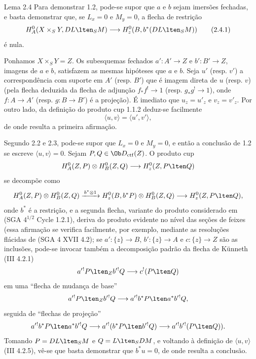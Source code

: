 \begin{statement}{Lema 2.4}
Para demonstrar 1.2, pode-se supor que $a$ e $b$ sejam imersões fechadas, e basta demonstrar que, se $L_x=0$ e $M_y=0$, a flecha de restrição
\begin{equation}
H_A^0(X\times_SY,DL\lten_SM)
 \longrightarrow H_z^0(B,b^*(DL\lten_SM))
\tag{2.4.1}
\end{equation}
é nula.
\end{statement}

Ponhamos $X\times_SY=Z$. Os subesquemas fechados $a':A'\to Z$ e $b':B'\to Z$, imagens de $a$ e $b$, satisfazem as mesmas hipóteses que $a$ e $b$. Seja $u'$ (resp. $v'$) a correspondência com suporte em $A'$ (resp. $B'$) que é imagem direta de $u$ (resp. $v$) (pela flecha deduzida da flecha de adjunção $f_*f^!\to 1$ (resp. $g_*g^!\to 1$), onde $f:A\to A'$ (resp. $g:B\to B'$) é a projeção). É imediato que $u_z=u'_z$ e $v_z=v'_z$. Por outro lado, da definição do produto cup 1.1.2 deduz-se facilmente
\[
\langle u,v\rangle=\langle u',v'\rangle,
\]
de onde resulta a primeira afirmação.

Segundo 2.2 e 2.3, pode-se supor que $L_x=0$ e $M_y=0$, e então a conclusão de 1.2 se escreve $\langle u,v\rangle=0$. Sejam $P,Q\in\Ob D_{\mathrm{ctf}}(Z)$. O produto cup
\[
H_A^0(Z,P)\otimes H_B^0(Z,Q)\longrightarrow H_z^0(Z,P\lten Q)
\]
se decompõe como
\[
H_A^0(Z,P)\otimes H_B^0(Z,Q)
 \xrightarrow{\,b^*\otimes 1\,}
H_z^0(B,b^*P)\otimes H_B^0(Z,Q)
 \longrightarrow H_z^0(Z,P\lten Q),
\]
onde $b^*$ é a restrição, e a segunda flecha, variante do produto considerado em (SGA $4^{1/2}$ Cycle 1.2.1), deriva do produto evidente no nível das seções de feixes (essa afirmação se verifica facilmente, por exemplo, mediante as resoluções flácidas de (SGA 4 XVII 4.2); se $a':\{z\}\to B$, $b':\{z\}\to A$ e $c:\{z\}\to Z$ são as inclusões, pode-se invocar também a decomposição padrão da flecha de Künneth (III 4.2.1)
\[
a'{}^!P\lten_Z b'{}^!Q\longrightarrow c^!(P\lten Q)
\]
em uma ``flecha de mudança de base''
\[
a'{}^!P\lten_Z b'{}^!Q\longrightarrow a'{}^!b^*P\lten a^*b'{}^!Q,
\]
seguida de ``flechas de projeção''
\[
a'{}^!b^*P\lten a^*b'{}^!Q
 \longrightarrow a'{}^!(b^*P\lten b'{}^!Q)
 \longrightarrow a'{}^!b'{}^!(P\lten Q)).
\]
Tomando $P=DL\lten_SM$ e $Q=L\lten_SDM$, e voltando à definição de $\langle u,v\rangle$ (III 4.2.5), vê-se que basta demonstrar que $b^*u=0$, de onde resulta a conclusão.
